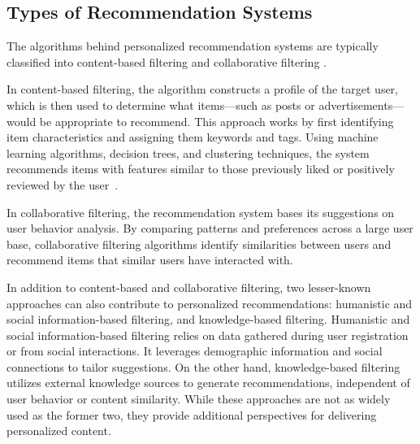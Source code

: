 \documentclass[10pt,twocolumn,twoside,a4paper]{article} %
\begin{document}
\subsection{Types of Recommendation Systems}
The algorithms behind personalized recommendation systems are typically classified into content-based filtering and collaborative filtering \cite{raghavendra2018personalized}.

In content-based filtering, the algorithm constructs a profile of the target user, which is then used to determine what items—such as posts or advertisements—would be appropriate to recommend. This approach works by first identifying item characteristics and assigning them keywords and tags. Using machine learning algorithms, decision trees, and clustering techniques, the system recommends items with features similar to those previously liked or positively reviewed by the user~\cite{raghavendra2018personalized}\cite{contentvscollaborative}.

In collaborative filtering, the recommendation system bases its suggestions on user behavior analysis. By comparing patterns and preferences across a large user base, collaborative filtering algorithms identify similarities between users and recommend items that similar users have interacted with.

In addition to content-based and collaborative filtering, two lesser-known approaches can also contribute to personalized recommendations: humanistic and social information-based filtering, and knowledge-based filtering. Humanistic and social information-based filtering relies on data gathered during user registration or from social interactions. It leverages demographic information and social connections to tailor suggestions. On the other hand, knowledge-based filtering utilizes external knowledge sources to generate recommendations, independent of user behavior or content similarity. While these approaches are not as widely used as the former two, they provide additional perspectives for delivering personalized content.
\end{document}
